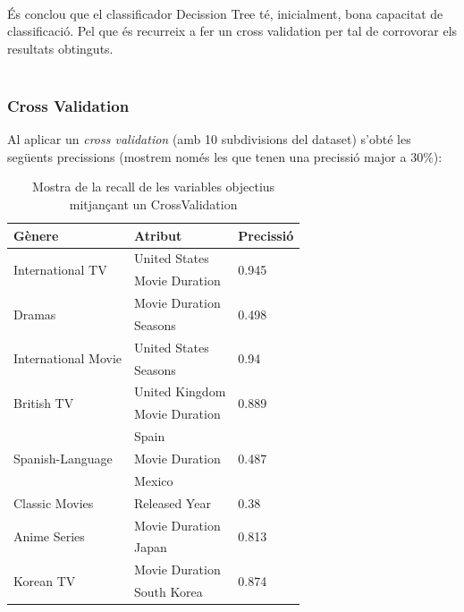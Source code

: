 \documentclass[a4paper, 11pt]{article}
\begin{document}
\\
És conclou que el classificador Decission Tree té, inicialment, bona capacitat de classificació. Pel que és recurreix a fer un cross validation per tal de corrovorar els resultats obtinguts.\\\\

\newpage 

\subsubsection{Cross Validation}
Al aplicar un \textit{cross validation} (amb 10 subdivisions del dataset) s'obté les següents precissions (mostrem només les que tenen una precissió major a $30\%$):
\begin{table}[h]
    \centering
    \begin{tabular}{l|l|l}
        \textbf{Gènere} & \textbf{Atribut} & \textbf{Precissió}\\\hline\hline
            \multirow{2}{*}{International TV} &  United States & \multirow{2}{*}{0.945} \\
            & Movie Duration& \\ \hline
        \multirow{2}{*}{Dramas} &  Movie Duration & \multirow{2}{*}{0.498} \\ 
        & Seasons & \\\hline
        \multirow{2}{*}{International Movie} &  United States & \multirow{2}{*}{0.94} \\
            & Seasons & \\ \hline
        \multirow{2}{*}{British TV} &  United Kingdom & \multirow{2}{*}{0.889} \\
            & Movie Duration &  \\ \hline
        \multirow{3}{*}{Spanish-Language} &  Spain & \multirow{3}{*}{0.487} \\
            & Movie Duration & \\
            & Mexico & \\ \hline
        Classic Movies & Released Year & 0.38 \\ \hline
        \multirow{2}{*}{Anime Series} & Movie Duration & \multirow{2}{*}{0.813}\\
        & Japan & \\ \hline
        \multirow{2}{*}{Korean TV} & Movie Duration & \multirow{2}{*}{0.874}\\
        & South Korea & \\ 
        
    \end{tabular}
    \caption{Mostra de la recall de les variables objectius mitjançant un CrossValidation}
    \label{tab:my_label}
\end{table}\\
\end{document}
